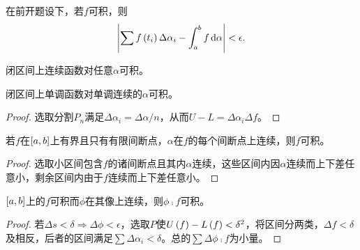 \documentclass{ctexrep}
\begin{document}
  \begin{theorem}
    \label{thm:intervalrepr}
    在前开题设下，若$f$可积，则
    \[ \abs{\sum f\left(t_i\right)\Delta\alpha_i - \int_{a}^{b} f \, \mathrm{d} \alpha}<\epsilon. \]
  \end{theorem}
  \begin{theorem}
    闭区间上连续函数对任意$\alpha$可积。
  \end{theorem}
  \begin{theorem}
    闭区间上单调函数对单调连续的$\alpha$可积。
  \end{theorem}
  \begin{proof}
    选取分割$P_n$满足$\Delta\alpha_i=\Delta\alpha/n$，从而$U-L=\Delta\alpha_i\Delta f$。 
  \end{proof}
  \begin{theorem}
    若$f$在$\left[a,b\right]$上有界且只有有限间断点，$\alpha$在$f$的每个间断点上连续，则$f$可积。
  \end{theorem}
  \begin{proof}
    选取小区间包含$f$的诸间断点且其内$\alpha$连续，这些区间内因$\alpha$连续而上下差任意小，剩余区间内由于$f$连续而上下差任意小。
  \end{proof}
  \begin{theorem}
    $\left[a,b\right]$上的$f$可积而$\phi$在其像上连续，则$\phi\comp f$可积。
  \end{theorem}
  \begin{proof}
    若$\Delta s<\delta \Rightarrow \Delta\phi<\epsilon$，选取$P$使$U\left(f\right)-L\left(f\right)<\delta^2$，将区间分两类，$\Delta f < \delta$及相反，后者的区间满足$\sum\Delta\alpha_i<\delta$。总的$\sum\Delta\phi\comp f$为小量。
  \end{proof}
\end{document}
